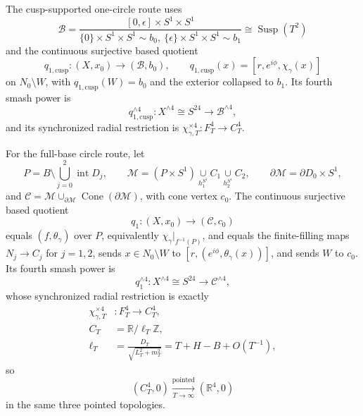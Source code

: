 \begin{enumerate}[leftmargin=1.8em]
The cusp-supported one-circle route uses
\[
 \mathcal B=
 \frac{[0,\epsilon]\times S^1\times S^1}
 {\{0\}\times S^1\times S^1\sim b_0,\ 
  \{\epsilon\}\times S^1\times S^1\sim b_1}
 \cong\operatorname{Susp}(T^2)
\]
and the continuous surjective based quotient
\[
 q_{1,\mathrm{cusp}}:(X,x_0)\longrightarrow(\mathcal B,b_0),\qquad
 q_{1,\mathrm{cusp}}(x)=[r,e^{i\phi},\chi_\gamma(x)]
\]
on \(N_0\setminus W\), with \(q_{1,\mathrm{cusp}}(W)=b_0\) and the
exterior collapsed to \(b_1\).  Its fourth smash power is
\[
 q_{1,\mathrm{cusp}}^{\wedge4}:X^{\wedge4}\cong S^{24}
 \longrightarrow\mathcal B^{\wedge4},
\]
and its synchronized radial restriction is
\(\chi_{\gamma,T}^{\times4}:F_T^4\to C_T^4\).

For the full-base circle route, let
\[
 P=B\setminus\bigcup_{j=0}^2\operatorname{int}D_j,\qquad
 \mathcal M=(P\times S^1)\underset{h_1^{S^1}}\cup C_1
                         \underset{h_2^{S^1}}\cup C_2,\qquad
 \partial\mathcal M=\partial D_0\times S^1,
\]
and
\(\mathcal C=\mathcal M\cup_{\partial\mathcal M}
\operatorname{Cone}(\partial\mathcal M)\), with cone vertex \(c_0\).
The continuous surjective based quotient
\[
 q_1:(X,x_0)\longrightarrow(\mathcal C,c_0)
\]
 equals \((f,\theta_\gamma)\) over \(P\), equivalently
 \(\chi_\gamma|_{f^{-1}(P)}\), and equals the finite-filling maps
\(N_j\to C_j\) for \(j=1,2\), sends
\(x\in N_0\setminus W\) to
 \([r,(e^{i\phi},\theta_\gamma(x))]\), and sends \(W\) to \(c_0\).  Its
fourth smash power is
\[
 q_1^{\wedge4}:X^{\wedge4}\cong S^{24}\longrightarrow
 \mathcal C^{\wedge4},
\]
whose synchronized radial restriction is exactly
\[
\begin{aligned}
 \chi_{\gamma,T}^{\times4}&:F_T^4\longrightarrow C_T^4,\\
 C_T&=\mathbb R/\ell_T\mathbb Z,\\
 \ell_T&=\frac{D_T}{\sqrt{L_T^2+m_T^2}}
       =T+H-B+O(T^{-1}),
\end{aligned}
\]
so
\[
 (C_T^4,0)
 \xrightarrow[T\to\infty]{\mathrm{pointed}}(\mathbb R^4,0)
\]
in the same three pointed topologies.


\end{enumerate}
